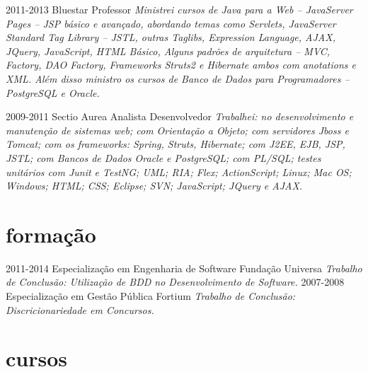 \documentclass[]{friggeri-cv}
\begin{document}
\begin{entrylist}
  \entry
    {2011-2013}
    {Bluestar}
    {Professor}
    {\emph{Ministrei cursos de Java para a Web – JavaServer Pages – JSP básico e avançado, abordando temas como Servlets, JavaServer Standard Tag Library – JSTL, outras Taglibs, Expression Language, AJAX, JQuery, JavaScript, HTML Básico, Alguns padrões de arquitetura – MVC, Factory, DAO Factory, Frameworks Struts2 e Hibernate ambos com anotations e XML. Além disso ministro os cursos de Banco de Dados para Programadores – PostgreSQL e Oracle.}}
\end{entrylist}

\newpage

\begin{entrylist}
  \entry
    {2009-2011}
    {Sectio Aurea}
    {Analista Desenvolvedor}
    {\emph{Trabalhei: no desenvolvimento e manutenção de sistemas web; com Orientação a Objeto; com servidores Jboss e Tomcat; com os frameworks: Spring, Struts, Hibernate; com J2EE, EJB, JSP, JSTL; com Bancos de Dados Oracle e PostgreSQL; com PL/SQL; testes unitários com Junit e TestNG; UML; RIA; Flex; ActionScript; Linux; Mac OS; Windows; HTML; CSS; Eclipse; SVN; JavaScript; JQuery e AJAX.}}
\end{entrylist}

\section{formação}

\begin{entrylist}
  \entry
    {2011-2014}
    {Especialização {\normalfont em Engenharia de Software}}
    {Fundação Universa}
    {\emph{Trabalho de Conclusão: Utilização de BDD no Desenvolvimento de Software.}}
  \entry
    {2007-2008}
    {Especialização {\normalfont em Gestão Pública}}
    {Fortium}
    {\emph{Trabalho de Conclusão: Discricionariedade em Concursos.}}
\end{entrylist}

\section{cursos}
\end{document}
